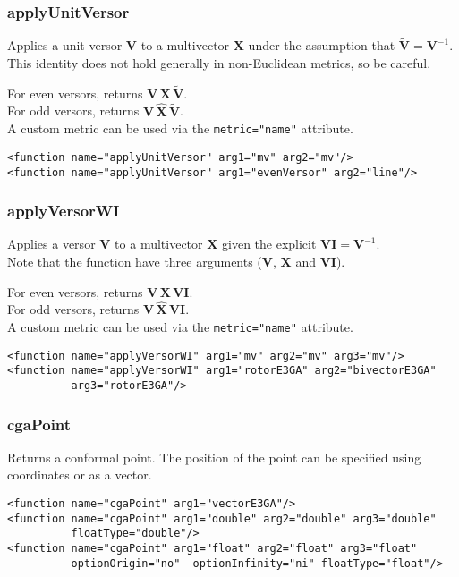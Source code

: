\documentclass[10pt, a4paper]{article}
\newcommand{\gav}[1]{\ensuremath{\mathbf{#1}}}
\newcommand{\gp}{\,}
\newcommand{\inv}[1]{{#1}^{-1}}
\newcommand{\rev}[1]{\widetilde{#1}}
\begin{document}
\subsubsection*{applyUnitVersor}

Applies a unit versor \gav{V} to a multivector \gav{X} under the assumption
that $\rev{\gav{V}} = \inv{\gav{V}}$. This identity does not hold generally 
in non-Euclidean metrics, so be careful.

\noindent For even versors, returns $\gav{V} \gp \gav{X} \gp \rev{\gav{V}}$.\\
For odd versors, returns $\gav{V} \gp \hat{\gav{X}} \gp \rev{\gav{V}}$.\\

\noindent A custom metric can be used via the {\tt metric="name"} attribute.
\begin{verbatim}
<function name="applyUnitVersor" arg1="mv" arg2="mv"/>
<function name="applyUnitVersor" arg1="evenVersor" arg2="line"/>
\end{verbatim}

\subsubsection*{applyVersorWI}

Applies a versor \gav{V} to a multivector \gav{X} given the explicit $\gav{VI} = \inv{\gav{V}}$.\\
Note that the function have three arguments (\gav{V}, \gav{X} and \gav{VI}).

\noindent For even versors, returns $\gav{V} \gp \gav{X} \gp \gav{VI}$.\\
For odd versors, returns $\gav{V} \gp \hat{\gav{X}} \gp \gav{VI}$.\\

\noindent A custom metric can be used via the {\tt metric="name"} attribute.
\begin{verbatim}
<function name="applyVersorWI" arg1="mv" arg2="mv" arg3="mv"/>
<function name="applyVersorWI" arg1="rotorE3GA" arg2="bivectorE3GA" 
          arg3="rotorE3GA"/>
\end{verbatim}

\subsubsection*{cgaPoint}

Returns a conformal point. The position of the point can be specified
using coordinates or as a vector.
\begin{verbatim}
<function name="cgaPoint" arg1="vectorE3GA"/>
<function name="cgaPoint" arg1="double" arg2="double" arg3="double" 
          floatType="double"/>
<function name="cgaPoint" arg1="float" arg2="float" arg3="float" 
          optionOrigin="no"  optionInfinity="ni" floatType="float"/>
\end{verbatim}
\end{document}
